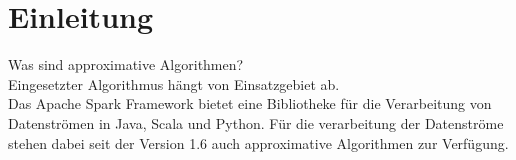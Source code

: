 \section{Einleitung}
Was sind approximative Algorithmen?\\
Eingesetzter Algorithmus hängt von Einsatzgebiet ab.\\





Das Apache Spark Framework bietet eine Bibliotheke für die Verarbeitung von Datenströmen in Java, Scala und Python. Für die verarbeitung der Datenströme stehen dabei seit der Version 1.6 auch approximative Algorithmen zur Verfügung.




